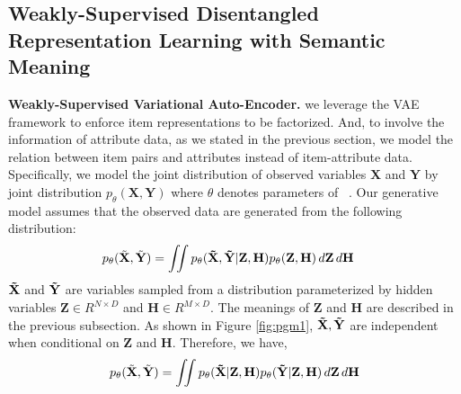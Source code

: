\subsection{Weakly-Supervised Disentangled Representation Learning with Semantic Meaning}
\textbf{Weakly-Supervised Variational Auto-Encoder.} 
we leverage the VAE framework \cite{KingmaW13VAE} to  enforce item representations to be factorized. And, to involve the information of attribute data, as we stated in the previous section, we model the relation between item pairs and attributes instead of item-attribute data. Specifically, we model the joint distribution of observed variables $\mathbf{X}$ and $\mathbf{Y}$ by joint distribution $p_{\theta}(\mathbf{X}, \mathbf{Y})$ where $\theta$ denotes parameters of \CGIR~. Our generative model assumes that the observed data are generated from the following distribution:
\begin{equation}
\begin{split}
p_{\theta}(\Tilde{\mathbf{X}}, \Tilde{\mathbf{Y}}) &= \iint p_{\theta}(\mathbf{\Tilde{X},\Tilde{Y}}|\mathbf{Z,H}) p_{\theta}(\mathbf{Z,H})  \,d\mathbf{Z} \,d\mathbf{H}
\end{split}
\label{equ:joint}
\end{equation}
$\mathbf{\Tilde{X}}$ and $\mathbf{\Tilde{Y}}$ are variables sampled from a distribution parameterized by hidden variables $\mathbf{Z} \in R^{N \times D}$ and $\mathbf{H} \in R^{M \times D}$. The meanings of $\mathbf{Z}$ and  $\mathbf{H}$ are described in the previous subsection. As shown in Figure \ref{fig:pgm1}, $\mathbf{\Tilde{X},\Tilde{Y}}$ are independent when conditional on $\mathbf{Z}$ and $\mathbf{H}$. Therefore, we have, 
\begin{equation}
\begin{split}
p_{\theta}(\Tilde{\mathbf{X}}, \Tilde{\mathbf{Y}}) = \iint p_{\theta}(\mathbf{\Tilde{X}}|\mathbf{Z,H}) p_{\theta}(\mathbf{\Tilde{Y}}|\mathbf{Z,H})  \,d\mathbf{Z} \,d\mathbf{H}
\end{split}
\label{equ:joint_split}
\end{equation}
